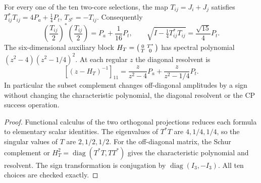 \documentclass[12pt,a4paper]{article}
\begin{document}
\begin{proposition}
\label{p4c:prop:v320-transfer-proof}
For every one of the ten two-core selections, the map
$T_{ij}=J_i+J_j$ satisfies
$T_{ij}^*T_{ij}=4P_a+\tfrac14P_t$,
$T_{S^c}=-T_{ij}$. Consequently
\[
 \left(\frac{T_{ij}}2\right)^*\left(\frac{T_{ij}}2\right)
 =P_a+\frac1{16}P_t,
 \qquad
 \sqrt{I-\tfrac14T_{ij}^*T_{ij}}
 =\frac{\sqrt{15}}4P_t.
\]
The six-dimensional auxiliary block
$H_T=\begin{psmallmatrix}0&T^*\\T&0\end{psmallmatrix}$
has spectral polynomial
$(z^2-4)(z^2-1/4)^2$. At each regular $z$ the diagonal resolvent
is
\[
 [(z-H_T)^{-1}]_{11}
 =\frac{z}{z^2-4}P_a+\frac{z}{z^2-1/4}P_t.
\]
In particular the subset complement changes off-diagonal
amplitudes by a sign without changing the characteristic polynomial,
the diagonal resolvent or the CP success operation.
\end{proposition}
\begin{proof}
Functional calculus of the two orthogonal projections reduces each
formula to elementary scalar identities. The eigenvalues of
$T^*T$ are $4,1/4,1/4$, so the singular values of $T$ are
$2,1/2,1/2$. For the off-diagonal matrix, the Schur complement
or $H_T^2=\operatorname{diag}(T^*T,TT^*)$ gives the characteristic
polynomial and resolvent. The sign transformation is conjugation by
$\operatorname{diag}(I_3,-I_3)$. All ten choices are checked exactly.
\end{proof}
\end{document}
